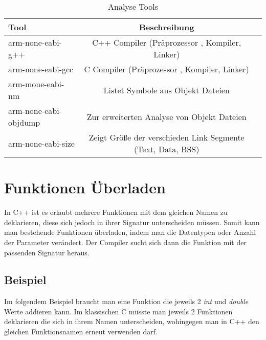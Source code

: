 \documentclass[MES,Master,ngerman]{twbook}%
\begin{document}
\begin{table}[!htb]
	\centering
	\begin{tabular}{| l | c | r |}
		\hline
		\textbf{Tool}  & \textbf{Beschreibung} \\ \hline
		arm-none-eabi-g++           & C++ Compiler (Präprozessor , Kompiler, Linker) \\ \hline
		arm-none-eabi-gcc       	& C	  Compiler (Präprozessor , Kompiler, Linker) \\ \hline
		arm-mone-eabi-nm        	& Listet Symbole aus Objekt Dateien \\ \hline
		arm-none-eabi-objdump		& Zur erweiterten Analyse von Objekt Dateien \\ \hline
		arm-none-eabi-size			& Zeigt Größe der verschieden Link Segmente (Text, Data, BSS) \\ \hline
	\end{tabular}
	
	\caption{Analyse Tools}
	\label{tbl:analystools}
	
\end{table}


\newpage
\section{Funktionen Überladen}
In C++ ist es erlaubt mehrere Funktionen mit dem gleichen Namen zu deklarieren, diese sich jedoch in ihrer Signatur unterscheiden müssen. Somit kann man bestehende Funktionen überladen, indem man die Datentypen oder Anzahl der Parameter verändert. Der Compiler sucht sich dann die Funktion mit der passenden Signatur heraus. 
\subsection{Beispiel} \label{beispiel:1}
Im folgendem Beispiel braucht man eine Funktion die jeweils 2 \textit{int} und \textit{double} Werte addieren kann. Im klassischen C müsste man jeweils 2 Funktionen deklarieren die sich in ihrem Namen unterscheiden, wohingegen man in C++ den gleichen Funktionsnamen erneut verwenden darf.
\begin{figure}[!htb]
	\begin{subfigure}[b]{0.5\textwidth}
		
		\label{fig:1}
	\end{subfigure}
	\begin{subfigure}[b]{0.5\textwidth}
		
		\label{fig:2}
	\end{subfigure}
\end{figure}
\end{document}
